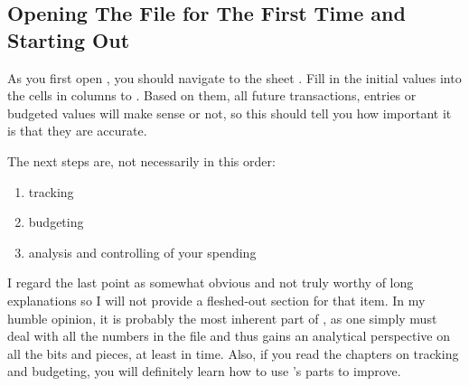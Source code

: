 \subsection{Opening The File for The First Time and Starting Out}
\label{subsec:opening-the-file}

As you first open \tfn, you should navigate to the sheet .
Fill in the initial values into the cells in columns  to .
Based on them, all future transactions, entries or budgeted values will make sense or not, so this should tell you how important it is that they are accurate.

The next steps are, not necessarily in this order:
\begin{enumerate}
	\item tracking
	\item budgeting
	\item analysis and controlling of your spending
\end{enumerate}

I regard the last point as somewhat obvious and not truly worthy of long explanations so I will not provide a fleshed-out section for that item.
In my humble opinion, it is probably the most inherent part of \tfn, as one simply must deal with all the numbers in the file and thus gains an analytical perspective on all the bits and pieces, at least in time.
Also, if you read the chapters on tracking and budgeting, you will definitely learn how to use \tfn's parts to improve.
